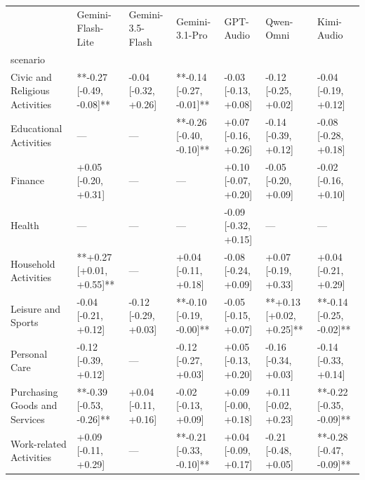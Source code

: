 \begin{tabular}{lllllll}
\toprule
 & Gemini-Flash-Lite & Gemini-3.5-Flash & Gemini-3.1-Pro & GPT-Audio & Qwen-Omni & Kimi-Audio \\
scenario &  &  &  &  &  &  \\
\midrule
Civic and Religious Activities & **-0.27 [-0.49, -0.08]** & -0.04 [-0.32, +0.26] & **-0.14 [-0.27, -0.01]** & -0.03 [-0.13, +0.08] & -0.12 [-0.25, +0.02] & -0.04 [-0.19, +0.12] \\
Educational Activities & — & — & **-0.26 [-0.40, -0.10]** & +0.07 [-0.16, +0.26] & -0.14 [-0.39, +0.12] & -0.08 [-0.28, +0.18] \\
Finance & +0.05 [-0.20, +0.31] & — & — & +0.10 [-0.07, +0.20] & -0.05 [-0.20, +0.09] & -0.02 [-0.16, +0.10] \\
Health & — & — & — & -0.09 [-0.32, +0.15] & — & — \\
Household Activities & **+0.27 [+0.01, +0.55]** & — & +0.04 [-0.11, +0.18] & -0.08 [-0.24, +0.09] & +0.07 [-0.19, +0.33] & +0.04 [-0.21, +0.29] \\
Leisure and Sports & -0.04 [-0.21, +0.12] & -0.12 [-0.29, +0.03] & **-0.10 [-0.19, -0.00]** & -0.05 [-0.15, +0.07] & **+0.13 [+0.02, +0.25]** & **-0.14 [-0.25, -0.02]** \\
Personal Care & -0.12 [-0.39, +0.12] & — & -0.12 [-0.27, +0.03] & +0.05 [-0.13, +0.20] & -0.16 [-0.34, +0.03] & -0.14 [-0.33, +0.14] \\
Purchasing Goods and Services & **-0.39 [-0.53, -0.26]** & +0.04 [-0.11, +0.16] & -0.02 [-0.13, +0.09] & +0.09 [-0.00, +0.18] & +0.11 [-0.02, +0.23] & **-0.22 [-0.35, -0.09]** \\
Work-related Activities & +0.09 [-0.11, +0.29] & — & **-0.21 [-0.33, -0.10]** & +0.04 [-0.09, +0.17] & -0.21 [-0.48, +0.05] & **-0.28 [-0.47, -0.09]** \\
\bottomrule
\end{tabular}
